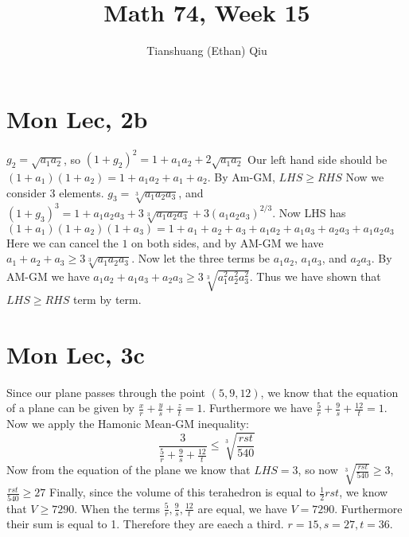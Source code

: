 \documentclass[12pt]{article}
\author{Tianshuang (Ethan) Qiu}
\begin{document}
\title{Math 74, Week 15}
\maketitle

\section{Mon Lec, 2b}
$g_2 = \sqrt{a_1a_2}$, so $(1+g_2)^2 = 1 + a_1a_2 + 2\sqrt{a_1a_2}$
\newline
Our left hand side should be $(1+a_1)(1+a_2) = 1 + a_1a_2 + a_1 + a_2$. By Am-GM, $LHS \geq RHS$
\newline
Now we consider 3 elements. $g_3 = \sqrt[3]{a_1a_2a_3}$, and $(1+g_3)^3 = 1 + a_1a_2a_3 + 3\sqrt[3]{a_1a_2a_3} + 3(a_1a_2a_3)^{2/3}$.
\newline
Now LHS has $(1+a_1)(1+a_2)(1+a_3) = 1 + a_1 + a_2 + a_3 + a_1a_2 + a_1a_3 + a_2a_3 + a_1a_2a_3 $
Here we can cancel the $1$ on both sides, and by AM-GM we have $a_1+a_2+a_3 \geq 3\sqrt[3]{a_1a_2a_3}$. Now let the three terms be $a_1a_2$, $ a_1a_3$, and $ a_2a_3$. By AM-GM we have $a_1a_2 + a_1a_3 + a_2a_3 \geq 3 \sqrt[3]{a_1^2a_2^2a_3^2}$.
\newline
Thus we have shown that $LHS \geq RHS$ term by term.


\section{Mon Lec, 3c}
Since our plane passes through the point $(5,9,12)$, we know that the equation of a plane can be given by $\frac{x}{r} +
\frac{y}{s} + \frac{z}{t} = 1$.
Furthermore we have $\frac{5}{r} + \frac{9}{s} + \frac{12}{t} = 1$. Now we apply the Hamonic Mean-GM inequality:
$$\frac{3}{\frac{5}{r} + \frac{9}{s} + \frac{12}{t}} \leq \sqrt[3]{\frac{rst}{540}}$$
Now from the equation of the plane we know that $LHS = 3$, so now $\sqrt[3]{\frac{rst}{540}} \geq 3$, $\frac{rst}{540} \geq 27$
Finally, since the volume of this terahedron is equal to $\frac{1}{2}rst$, we know that $V \geq 7290$.
\newline
When the terms $\frac{5}{r}, \frac{9}{s},\frac{12}{t}$ are equal, we have $V = 7290$. Furthermore their sum is equal to 1. Therefore they are eaech a third. $r = 15, s = 27, t = 36$.
\end{document}
